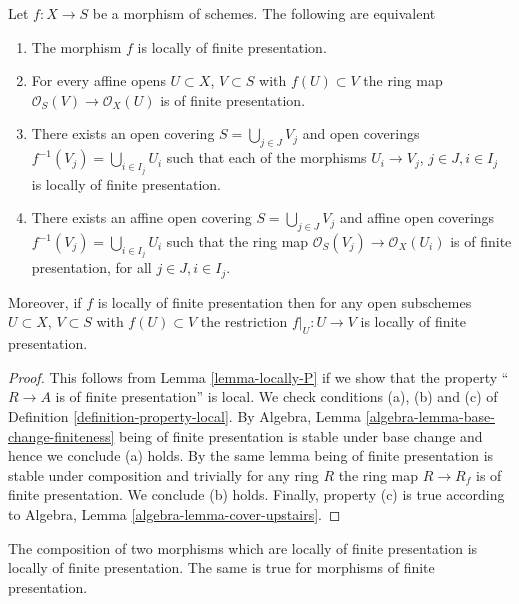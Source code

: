 \begin{lemma}
\label{lemma-locally-finite-presentation-characterize}
Let $f : X \to S$ be a morphism of schemes.
The following are equivalent
\begin{enumerate}
\item The morphism $f$ is locally of finite presentation.
\item For every affine opens $U \subset X$, $V \subset S$
with $f(U) \subset V$ the ring map
$\mathcal{O}_S(V) \to \mathcal{O}_X(U)$ is of finite presentation.
\item There exists an open covering $S = \bigcup_{j \in J} V_j$
and open coverings $f^{-1}(V_j) = \bigcup_{i \in I_j} U_i$ such
that each of the morphisms $U_i \to V_j$, $j\in J, i\in I_j$
is locally of finite presentation.
\item There exists an affine open covering $S = \bigcup_{j \in J} V_j$
and affine open coverings $f^{-1}(V_j) = \bigcup_{i \in I_j} U_i$ such
that the ring map $\mathcal{O}_S(V_j) \to \mathcal{O}_X(U_i)$ is
of finite presentation, for all $j\in J, i\in I_j$.
\end{enumerate}
Moreover, if $f$ is locally of finite presentation then for
any open subschemes $U \subset X$, $V \subset S$ with $f(U) \subset V$
the restriction $f|_U : U \to V$ is locally of finite presentation.
\end{lemma}

\begin{proof}
This follows from Lemma \ref{lemma-locally-P} if we show that
the property ``$R \to A$ is of finite presentation'' is local.
We check conditions (a), (b) and (c) of Definition
\ref{definition-property-local}.
By Algebra, Lemma \ref{algebra-lemma-base-change-finiteness}
being of finite presentation is stable under base change and hence
we conclude (a) holds. By the same lemma being of finite presentation
is stable under composition and trivially for any ring
$R$ the ring map $R \to R_f$ is of finite presentation.
We conclude (b) holds. Finally, property (c) is true
according to Algebra, Lemma \ref{algebra-lemma-cover-upstairs}.
\end{proof}

\begin{lemma}
\label{lemma-composition-finite-presentation}
The composition of two morphisms which are locally of finite presentation is
locally of finite presentation.
The same is true for morphisms of finite presentation.
\end{lemma}

